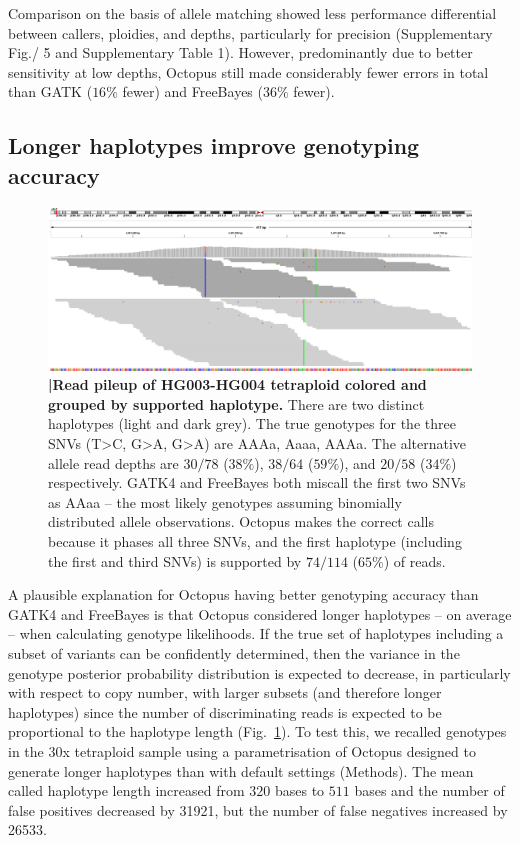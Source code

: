 \documentclass[notitlepage, twocolumn, 10pt]{article}
\begin{document}
Comparison on the basis of allele matching showed less performance differential between callers, ploidies, and depths, particularly for precision (Supplementary Fig./ 5 and Supplementary Table 1). However, predominantly due to better sensitivity at low depths, Octopus still made considerably fewer errors in total than GATK ($16\%$ fewer) and FreeBayes ($36\%$ fewer).

\subsection*{Longer haplotypes improve genotyping accuracy}

\begin{figure}[tp]
	\centering
    \includegraphics[width=\textwidth,height=0.4\textwidth]{figures/tetraploid_haplotypes.png}
    \caption{\textbf{|\:Read pileup of HG003-HG004 tetraploid colored and grouped by supported haplotype.} There are two distinct haplotypes (light and dark grey). The true genotypes for the three SNVs (T>C, G>A, G>A) are AAAa, Aaaa, AAAa. The alternative allele read depths are $30/78$ ($38\%$), $38/64$ ($59\%$), and $20/58$ ($34\%$) respectively. GATK4 and FreeBayes both miscall the first two SNVs as AAaa -- the most likely genotypes assuming binomially distributed allele observations. Octopus makes the correct calls because it phases all three SNVs, and the first haplotype (including the first and third SNVs) is supported by $74/114$ ($65\%$) of reads.}
    \label{fig:tetraploid_haplotypes}
\end{figure}

A plausible explanation for Octopus having better genotyping accuracy than GATK4 and FreeBayes is that Octopus considered longer haplotypes -- on average -- when calculating genotype likelihoods. If the true set of haplotypes including a subset of variants can be confidently determined, then the variance in the genotype posterior probability distribution is expected to decrease, in particularly with respect to copy number, with larger subsets (and therefore longer haplotypes) since the number of discriminating reads is expected to be proportional to the haplotype length (Fig.\ \ref{fig:tetraploid_haplotypes}). To test this, we recalled genotypes in the $30$x tetraploid sample using a parametrisation of Octopus designed to generate longer haplotypes than with default settings (Methods). The mean called haplotype length increased from $320$ bases to $511$ bases and the number of false positives decreased by \num[group-separator={,}]{31921}, but the number of false negatives increased by \num[group-separator={,}]{26533}.
\end{document}
